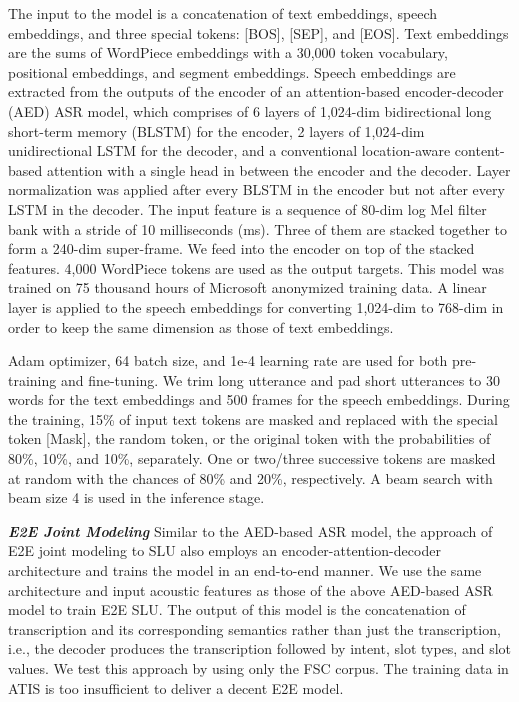 \documentclass{article}
\begin{document}
The input to the model is a concatenation of text embeddings, speech embeddings, and three special tokens: [BOS], [SEP], and [EOS]. Text embeddings are the sums of WordPiece embeddings with a 30,000 token vocabulary, positional embeddings, and segment embeddings. Speech embeddings are extracted from the outputs of the encoder of an attention-based encoder-decoder (AED) ASR model, which comprises of 6 layers of 1,024-dim bidirectional long short-term memory (BLSTM) for the encoder, 2 layers of 1,024-dim unidirectional LSTM for the decoder, and a conventional location-aware content-based attention \cite{NIPS2015_5847} with a single head in between the encoder and the decoder. Layer normalization \cite{ba2016layer} was applied after every BLSTM in the encoder but not after every LSTM in the decoder. The input feature is a sequence of 80-dim log Mel filter bank with a stride of 10 milliseconds (ms). Three of them are stacked together to form a 240-dim super-frame. We feed into the encoder on top of the stacked features. 4,000 WordPiece tokens are used as the output targets. This model was trained on 75 thousand hours of Microsoft anonymized training data. A linear layer is applied to the speech embeddings for converting 1,024-dim to 768-dim in order to keep the same dimension as those of text embeddings. 

 Adam optimizer, 64 batch size, and 1e-4 learning rate are used for both pre-training and fine-tuning. We trim long utterance and pad short utterances to 30 words for the text embeddings and 500 frames for the speech embeddings. During the training, 15\% of input text tokens are masked and replaced with the special token [Mask], the random token, or the original token with the probabilities of 80\%, 10\%, and 10\%, separately. One or two/three successive tokens are masked at random with the chances of 80\% and 20\%, respectively. A beam search with beam size 4 is used in the inference stage.

\textit{\textbf{E2E Joint Modeling}}   Similar to the AED-based ASR model, the approach of E2E joint modeling to SLU also employs an encoder-attention-decoder architecture and trains the model in an end-to-end manner. We use the same architecture and input acoustic features as those of the above AED-based ASR model to train E2E SLU. The output of this model is the concatenation of transcription and its corresponding semantics rather than just the transcription, i.e., the decoder produces the transcription followed by intent, slot types, and slot values. We test this approach by using only the FSC corpus. The training data in ATIS is too insufficient to deliver a decent E2E model. 
\end{document}
